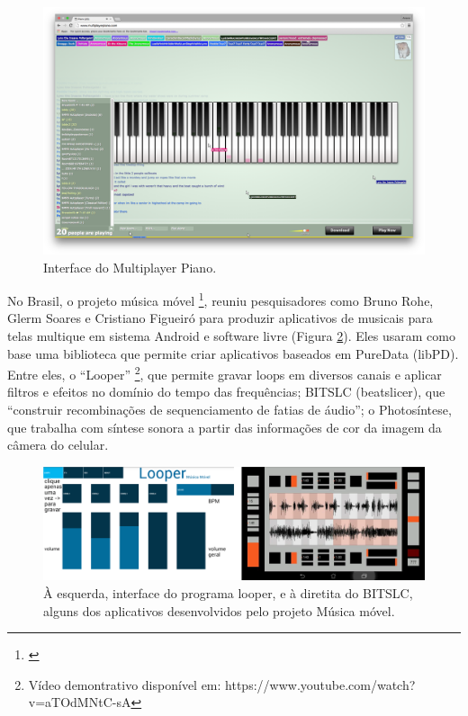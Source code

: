 \begin{figure}
    \caption{\label{multiplayer}Interface do Multiplayer Piano.}
   
        \includegraphics[width=1\linewidth]{pictures/cap2/multiplayerpiano}
   
\end{figure}


No Brasil, o projeto música móvel \footnote{\cite{Rohde2014}}, reuniu pesquisadores como Bruno Rohe, Glerm Soares e Cristiano Figueiró para produzir aplicativos de musicais para telas multique em sistema Android e software livre (Figura \ref{mmovel}). Eles usaram como base uma biblioteca que permite criar aplicativos baseados em PureData (libPD). Entre eles, o ``Looper'' \footnote{Vídeo demontrativo disponível em: https://www.youtube.com/watch?v=aTOdMNtC-sA}, que permite gravar loops em diversos canais e aplicar filtros e efeitos no domínio do tempo das frequências; B\/I\/T\/S\/L\/C (beatslicer), que ``construir
recombinações de sequenciamento de fatias de áudio''; o Photosíntese, que trabalha com síntese sonora a partir das informações de cor da imagem da câmera do celular.

\begin{figure}
    \caption{\label{mmovel}À esquerda, interface do programa looper, e à diretita do B\/I\/T\/S\/L\/C, alguns dos aplicativos desenvolvidos pelo projeto Música móvel.}
    
        \includegraphics[width=1\linewidth]{pictures/cap2/musicamovel}
    
\end{figure}

